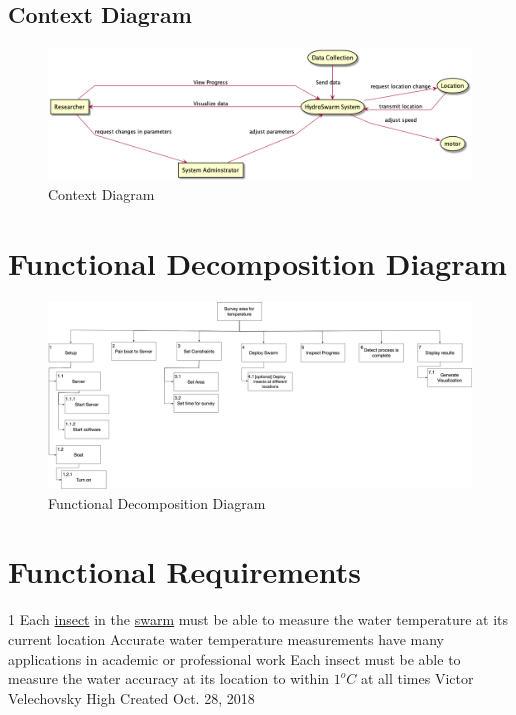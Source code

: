 \documentclass[11pt]{article}
\begin{document}
\subsection{Context Diagram}
\begin{figure}[H]
   \centering
   \includegraphics[width=\textwidth]{diagrams/context.png}
   \caption{Context Diagram}
   \label{fig:cd}
\end{figure}

\section{Functional Decomposition Diagram}
\begin{figure}[H]
   \centering
   \includegraphics[width=\textwidth]{diagrams/functionaldecomp.png}
   \caption{Functional Decomposition Diagram}
   \label{fig:fdd}
\end{figure}

\section{Functional Requirements}

\functionalRequirement
{1}
{Each \hyperref[sec:definitions]{insect} in the
\hyperref[sec:definitions]{swarm}
must be able to measure
the water temperature at its current location}
{Accurate water temperature measurements have many applications
in academic or professional work}
{Each insect must be able to measure the water accuracy at its location
to within \pm $ 1^o C$ at all times}
{Victor Velechovsky}
{High}
{Created Oct. 28, 2018}
\end{document}
